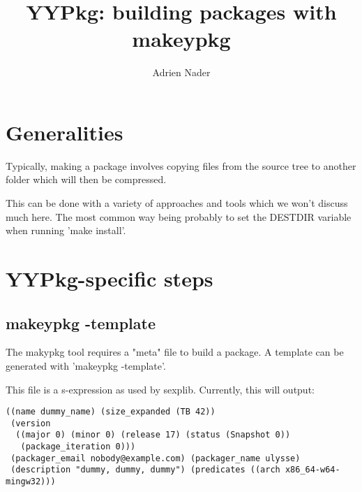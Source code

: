 \documentclass[a4paper]{article}
\author{Adrien Nader}
\title{YYPkg: building packages with makeypkg}
\begin{document}
\maketitle

\tableofcontents

\section{Generalities}
Typically, making a package involves copying files from the source tree to another folder which will then be compressed.

This can be done with a variety of approaches and tools which we won't discuss much here. The most common way being probably to set the DESTDIR variable when running 'make install'.

\section{YYPkg-specific steps}
\subsection{makeypkg -template}
The makypkg tool requires a "meta" file to build a package. A template can be generated with 'makeypkg -template'.

This file is a s-expression as used by sexplib. Currently, this will output:
\begin{verbatim}
((name dummy_name) (size_expanded (TB 42))
 (version
  ((major 0) (minor 0) (release 17) (status (Snapshot 0))
   (package_iteration 0)))
 (packager_email nobody@example.com) (packager_name ulysse)
 (description "dummy, dummy, dummy") (predicates ((arch x86_64-w64-mingw32)))
\end{verbatim}
\end{document}
